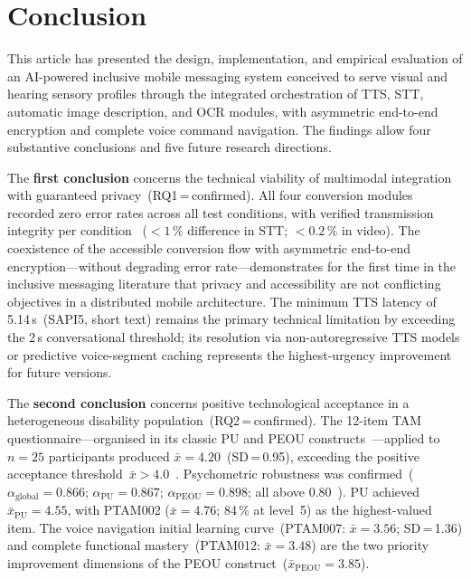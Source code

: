 \documentclass[journal]{IEEEtran}
\begin{document}
	\section{Conclusion}
	\label{sec:conclusion}
	This article has presented the design, implementation, and empirical
	evaluation of an AI-powered inclusive mobile messaging system
	conceived to serve visual and hearing sensory profiles through the
	integrated orchestration of TTS, STT, automatic image description,
	and OCR modules, with asymmetric end-to-end encryption and complete
	voice command navigation.
	The findings allow four substantive conclusions and five future
	research directions.
	
	The \textbf{first conclusion} concerns the technical viability of
	multimodal integration with guaranteed privacy~(RQ1\,=\,confirmed).
	All four conversion modules recorded zero error rates across all
	test conditions, with verified transmission integrity per condition
	~($<1\,\%$ difference in STT; $<0.2\,\%$ in video).
	The coexistence of the accessible conversion flow with asymmetric
	end-to-end encryption---without degrading error rate---demonstrates
	for the first time in the inclusive messaging literature that
	privacy and accessibility are not conflicting objectives in a
	distributed mobile architecture.
	The minimum TTS latency of 5.14\,s~(SAPI5, short text) remains
	the primary technical limitation by exceeding the 2\,s conversational
	threshold; its resolution via non-autoregressive TTS models or
	predictive voice-segment caching represents the highest-urgency
	improvement for future versions.
	
	The \textbf{second conclusion} concerns positive technological
	acceptance in a heterogeneous disability population~(RQ2\,=\,confirmed).
	The 12-item TAM questionnaire---organised in its classic PU and
	PEOU constructs~\cite{davis1989}---applied to $n{=}25$ participants
	produced $\bar{x}{=}4.20$~(SD\,=\,0.95), exceeding the positive
	acceptance threshold~$\bar{x}{>}4.0$~\cite{julianto2023}.
	Psychometric robustness was confirmed~($\alpha_{\text{global}}{=}0.866$;
	$\alpha_{\text{PU}}{=}0.867$; $\alpha_{\text{PEOU}}{=}0.898$;
	all above 0.80~\cite{nunnally1978}).
	PU achieved $\bar{x}_{\text{PU}}{=}4.55$, with PTAM002
	($\bar{x}{=}4.76$; 84\,\% at level~5) as the highest-valued item.
	The voice navigation initial learning curve~(PTAM007:
	$\bar{x}{=}3.56$; SD\,=\,1.36) and complete functional
	mastery~(PTAM012: $\bar{x}{=}3.48$) are the two priority
	improvement dimensions of the PEOU construct~($\bar{x}_{\text{PEOU}}{=}3.85$).
	
\end{document}
